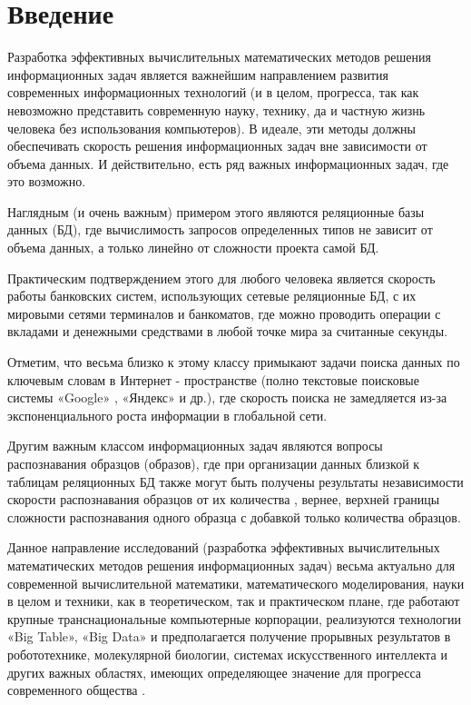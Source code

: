 \chapter*{Введение}							%

Разработка эффективных  вычислительных математических методов решения информационных задач является важнейшим направлением развития современных  информационных технологий (и в целом, прогресса, так как невозможно представить современную науку, технику, да и частную жизнь человека  без использования компьютеров). 
В идеале, эти методы должны обеспечивать скорость решения  информационных задач вне зависимости от объема данных. И действительно, есть ряд важных  информационных задач, где это возможно. 

Наглядным (и очень важным) примером  этого являются реляционные базы данных (БД), где вычислимость запросов определенных типов не зависит от объема данных, а только линейно от сложности проекта самой БД.

Практическим подтверждением этого для любого человека является скорость работы банковских систем, использующих сетевые реляционные БД,  с их мировыми сетями терминалов и банкоматов, где можно проводить операции с вкладами и денежными средствами в любой точке мира за считанные секунды.

Отметим, что весьма близко к этому классу  примыкают задачи поиска данных по ключевым словам в Интернет - пространстве (полно текстовые поисковые системы «Google» \cite{BigData}, «Яндекс» и др.), где скорость поиска не замедляется из-за экспоненциального роста информации в глобальной сети.

Другим  важным классом информационных задач являются вопросы распознавания  образцов (образов), где при организации данных близкой к таблицам реляционных БД также могут быть получены результаты независимости скорости  распознавания  образцов от их количества \cite{Samara}, вернее, верхней границы сложности распознавания одного образца с добавкой только количества образцов. 

Данное направление исследований (разработка эффективных вычислительных математических методов решения информационных задач) весьма актуально для современной вычислительной математики, математического моделирования, науки в целом и техники, как в теоретическом, так и  практическом плане, где работают крупные транснациональные компьютерные корпорации, реализуются технологии «Big Table»,  «Big Data» и предполагается получение прорывных результатов в робототехнике, молекулярной биологии, системах искусственного интеллекта и других важных областях, имеющих определяющее значение для прогресса современного общества \cite{BigTable,BigData}.

